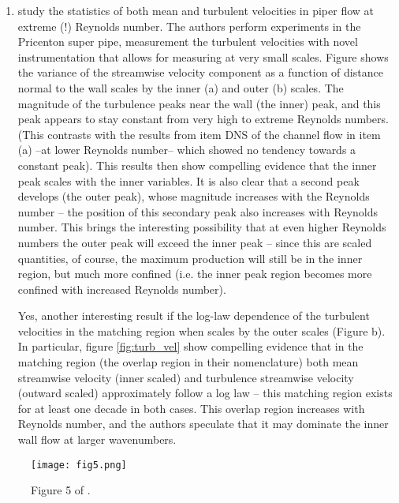 \documentclass[11pt]{article}
\begin{document}
\begin{enumerate}[label=(\alph*)]
    \item  \cite{hultmark_etal201} study the statistics of both mean and turbulent velocities in
        piper flow at extreme (!) Reynolds number. The authors perform experiments in the Pricenton
        super pipe, measurement the turbulent velocities with novel instrumentation that allows
        for measuring at very small scales. Figure \cite{fig:turb_vel} shows the variance of the
        streamwise velocity component as a function of distance normal to the wall scales by the
        inner (a) and outer (b) scales. The magnitude of the turbulence peaks near the wall (the inner)
        peak, and this peak appears to stay constant from very high to extreme Reynolds numbers. (This 
        contrasts with the results from item DNS of the channel flow in item (a) –at lower Reynolds
         number– which showed no tendency towards a constant peak). This results then show compelling
          evidence that the inner peak scales with the inner variables. It is also clear that a second
         peak develops (the outer peak), whose magnitude increases with the Reynolds number – the position
         of this secondary peak also increases with Reynolds number. This brings the interesting possibility         that at even higher Reynolds numbers the outer peak will exceed the inner peak – since this are
         scaled quantities, of course, the maximum production will still be in the inner region, but much
         more confined (i.e. the inner peak region becomes more confined with increased Reynolds number). 

        Yes, another interesting result if the log-law dependence of the turbulent velocities in the 
        matching region when scales by the outer scales (Figure \cite{fig:turb_vel} b). In particular,
        figure \ref{fig:turb_vel} show compelling evidence that in the matching region (the overlap region 
        in their nomenclature) both mean streamwise velocity (inner scaled) and turbulence streamwise 
        velocity (outward scaled) approximately follow a log law – this matching region exists for at
        least one decade in both cases. This overlap region increases with Reynolds number, and the authors
        speculate that it may dominate the inner wall flow at larger wavenumbers.  

\end{enumerate}


\begin{figure}[ht]
\begin{center}
\texttt{[image: fig5.png]}\\
\end{center}
\caption{Figure 5 of \cite{bernardini_etal2014}.}
\label{fig:mean_vel}
\end{figure}
\end{document}
